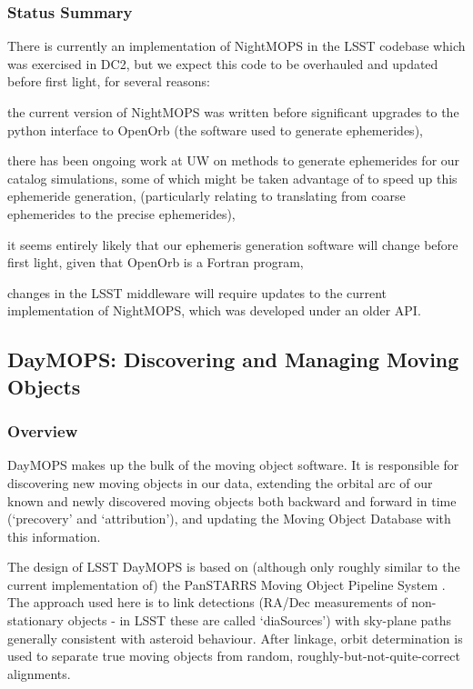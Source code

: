 \subsubsection{Status Summary}

There is currently an implementation of NightMOPS in the LSST
codebase which was exercised in DC2, but we expect this code to be overhauled and updated before
first light, for several reasons: 
\begin{itemize}
{\item the current version of NightMOPS was written before significant
upgrades to the python interface to OpenOrb (the software used to
generate ephemerides),}
{\item there has been ongoing work at UW on methods to generate
  ephemerides for our catalog simulations, some of which might be
  taken advantage of to speed up this ephemeride generation,
  (particularly relating to translating from coarse ephemerides to the
  precise ephemerides), }
{\item it seems entirely likely that our ephemeris generation software
  will change before first light, given that OpenOrb is a Fortran
  program,}
{\item changes in the LSST middleware will require updates to the
  current implementation of NightMOPS, which was developed under an
  older API.}
\end{itemize}


\subsection{DayMOPS: Discovering and Managing Moving Objects}

\subsubsection{Overview} 
\label{daymopsOverview}

DayMOPS makes up the bulk of the moving object software. It is
responsible for discovering new moving objects in our data, extending
the orbital arc of our known and newly discovered moving objects both
backward and forward in time (`precovery' and `attribution'), and
updating the Moving Object Database with this information. 

The design of LSST DayMOPS is based on (although only roughly similar
to the current implementation of) the PanSTARRS Moving Object
Pipeline System \citep{psMOPSDesign}.  The approach used here is to
link detections (RA/Dec measurements of non-stationary objects - in
LSST these are called `diaSources') with sky-plane paths generally consistent with
asteroid behaviour. After linkage, orbit determination is used to
separate true moving objects from random, roughly-but-not-quite-correct alignments. 

